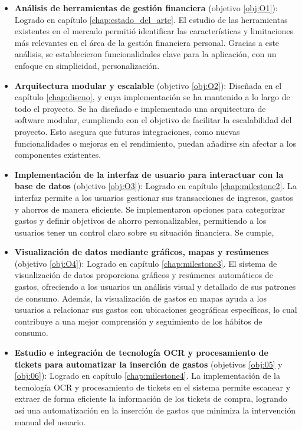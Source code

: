 \begin{itemize}
    \item \textbf{Análisis de herramientas de gestión financiera} (objetivo \ref{obj:O1}): Logrado en capítulo \ref{chap:estado_del_arte}. El estudio de las herramientas existentes en el mercado permitió identificar las características y limitaciones más relevantes en el área de la gestión financiera personal. Gracias a este análisis, se establecieron funcionalidades clave para la aplicación, con un enfoque en simplicidad, personalización.

    \item \textbf{Arquitectura modular y escalable} (objetivo \ref{obj:O2}): Diseñada en el capítulo \ref{chap:diseno}, y cuya implementación se ha mantenido a lo largo de todo el proyecto. Se ha diseñado e implementado una arquitectura de software modular, cumpliendo con el objetivo de facilitar la escalabilidad del proyecto. Esto asegura que futuras integraciones, como nuevas funcionalidades o mejoras en el rendimiento, puedan añadirse sin afectar a los componentes existentes.

    \item \textbf{Implementación de la interfaz de usuario para interactuar con la base de datos} (objetivo \ref{obj:O3}): Logrado en capítulo \ref{chap:milestone2}. La interfaz permite a los usuarios gestionar sus transacciones de ingresos, gastos y ahorros de manera eficiente. Se implementaron opciones para categorizar gastos y definir objetivos de ahorro personalizables, permitiendo a los usuarios tener un control claro sobre su situación financiera. Se cumple,

    \item \textbf{Visualización de datos mediante gráficos, mapas y resúmenes} (objetivo \ref{obj:O4}): Logrado en capítulo \ref{chap:milestone3}. El sistema de visualización de datos proporciona gráficos y resúmenes automáticos de gastos, ofreciendo a los usuarios un análisis visual y detallado de sus patrones de consumo. Además, la visualización de gastos en mapas ayuda a los usuarios a relacionar sus gastos con ubicaciones geográficas específicas, lo cual contribuye a una mejor comprensión y seguimiento de los hábitos de consumo.
    
    \item \textbf{Estudio e integración de tecnología OCR y procesamiento de tickets para automatizar la inserción de gastos} (objetivos \ref{obj:05} y \ref{obj:06}): Logrado en capítulo \ref{chap:milestone4}. La implementación de la tecnología OCR y procesamiento de tickets en el sistema permite escanear y extraer de forma eficiente la información de los tickets de compra, logrando así una automatización en la inserción de gastos que minimiza la intervención manual del usuario. 


\end{itemize}
